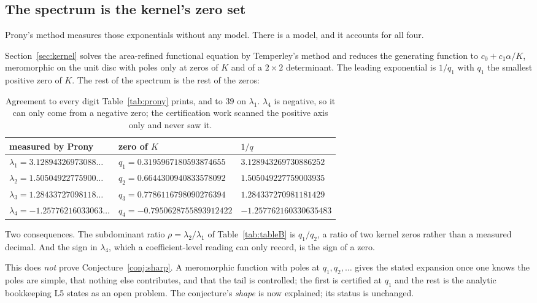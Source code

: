 \documentclass[11pt]{article}
\begin{document}
\subsection{The spectrum is the kernel's zero set}
\label{sec:kernelspectrum}

Prony's method measures those exponentials without any model. There is a model,
and it accounts for all four.

Section~\ref{sec:kernel} solves the
area-refined functional equation by Temperley's method and reduces the
generating function to $c_0 + c_1\alpha/K$, meromorphic on the unit disc with
poles only at zeros of $K$ and of a $2\times2$ determinant. The leading
exponential is $1/q_1$ with $q_1$ the smallest positive zero of $K$. The rest
of the spectrum is the rest of the zeros:

\begin{table}[H]
\centering\small
\begin{tabular}{l l l}
\toprule
measured by Prony & zero of $K$ & $1/q$ \\
\midrule
$\lambda_1 = 3.12894326973088\dots$ & $q_1 = 0.3195967180593874655$ & $3.128943269730886252$ \\
$\lambda_2 = 1.50504922775900\dots$ & $q_2 = 0.6644300940833578092$ & $1.505049227759003935$ \\
$\lambda_3 = 1.28433727098118\dots$ & $q_3 = 0.7786116798090276394$ & $1.284337270981181429$ \\
$\lambda_4 = -1.25776216033063\dots$ & $q_4 = -0.7950628755893912422$ & $-1.257762160330635483$ \\
\bottomrule
\end{tabular}
\caption{Agreement to every digit Table~\ref{tab:prony} prints, and to $39$ on
$\lambda_1$. $\lambda_4$ is negative, so it can only come from a negative zero;
the certification work scanned the positive axis only and never saw it.}
\label{tab:kernelzeros}
\end{table}

Two consequences. The subdominant ratio $\rho = \lambda_2/\lambda_1$ of
Table~\ref{tab:tableB} is $q_1/q_2$, a ratio of two kernel zeros rather than a
measured decimal. And the sign in $\lambda_4$, which a coefficient-level reading
can only record, is the sign of a zero.

This does \emph{not} prove Conjecture~\ref{conj:sharp}. A
meromorphic function with poles at $q_1, q_2, \dots$ gives the stated expansion
once one knows the poles are simple, that nothing else contributes, and that the
tail is controlled; the first is certified at $q_1$ and the rest is the analytic
bookkeeping L5 states as an open problem. The conjecture's \emph{shape} is now
explained; its status is unchanged.
\end{document}
